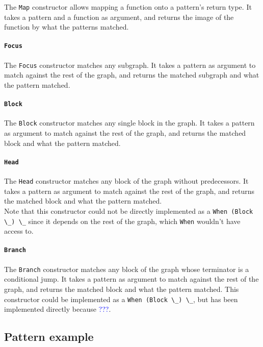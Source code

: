 \documentclass[11pt]{article}
\newcommand{\inlinecoq}[1]{\mbox{\lstinline[style=customcoq,columns=fixed,basewidth=.48em]{#1}}}
\newcommand{\ilc}[1]{\inlinecoq{#1}}
\newcommand{\leon}[1]{\textcolor{blue}{#1}}
\begin{document}
The \ilc{Map} constructor allows mapping a function onto a pattern's return type.
It takes a pattern and a function as argument, and returns the image of the function by what the patterns matched.

\paragraph{\ilc{Focus}}

The \ilc{Focus} constructor matches any subgraph.
It takes a pattern as argument to match against the rest of the graph, and returns the matched subgraph and what the pattern matched.

\paragraph{\ilc{Block}}

The \ilc{Block} constructor matches any single block in the graph.
It takes a pattern as argument to match against the rest of the graph, and returns the matched block and what the pattern matched.

\paragraph{\ilc{Head}}

The \ilc{Head} constructor matches any block of the graph without predecessors.
It takes a pattern as argument to match against the rest of the graph, and returns the matched block and what the pattern matched.\\
Note that this constructor could not be directly implemented as a \ilc{When (Block \_) \_} since it depends on the rest of the graph, which \ilc{When} wouldn't have access to.

\paragraph{\ilc{Branch}}

The \ilc{Branch} constructor matches any block of the graph whose terminator is a conditional jump.
It takes a pattern as argument to match against the rest of the graph, and returns the matched block and what the pattern matched.
This constructor could be implemented as a \ilc{When (Block \_) \_}, but has been implemented directly because \leon{???}.

\subsection*{Pattern example}
\end{document}
